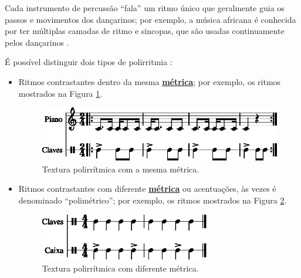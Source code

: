 Cada instrumento de percussão ``fala'' um ritmo único que geralmente guia os passos e movimentos dos dançarinos;
por exemplo, a música africana é conhecida por ter múltiplas camadas de ritmo e sincopas,
 que são usadas continuamente pelos dançarinos \cite[pp. 35]{holland2013music}.


É possível distinguir dois tipos de polirritmia \cite[pp. 687]{apel1969harvard}:
\begin{itemize}
\item Ritmos contrastantes dentro da mesma \hyperref[def:Metrica]{\textbf{métrica}};
por exemplo, os ritmos mostrados na Figura \ref{fig:polirritmia1-1}.
\begin{figure}[!h]
\centering
    \includegraphics[width=\textwidth]{chapters/cap-musicalidade-percepcion/polirritmia1-1.eps}
  \caption{Textura polirrítmica com a mesma métrica.}
\label{fig:polirritmia1-1}
\end{figure}
\item Ritmos contrastantes com diferente \hyperref[def:Metrica]{\textbf{métrica}} ou acentuações, 
às vezes é denominado ``polimétrico'';
por exemplo, os ritmos mostrados na Figura \ref{fig:polirritmia2-1}.
\begin{figure}[!h]
\centering
    \includegraphics[width=0.7\textwidth]{chapters/cap-musicalidade-percepcion/polirritmia2-1.eps}
  \caption{Textura polirrítmica com diferente métrica.}
\label{fig:polirritmia2-1}
\end{figure}
\end{itemize}


